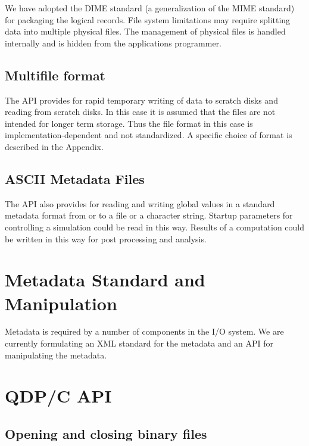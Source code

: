 \documentclass{article}
\begin{document}
We have adopted the DIME standard (a generalization of the MIME
standard) for packaging the logical records.  File system limitations
may require splitting data into multiple physical files.  The
management of physical files is handled internally and is hidden from
the applications programmer.

\subsection{Multifile format}

The API provides for rapid temporary writing of data to scratch disks
and reading from scratch disks.  In this case it is assumed that the
files are not intended for longer term storage.  Thus the file format
in this case is implementation-dependent and not standardized.  A
specific choice of format is described in the Appendix.

\subsection{ASCII Metadata Files}

The API also provides for reading and writing global values in a
standard metadata format from or to a file or a character string.
Startup parameters for controlling a simulation could be read in this
way.  Results of a computation could be written in this way for post
processing and analysis.

\section{Metadata Standard and Manipulation}

Metadata is required by a number of components in the I/O system.  We
are currently formulating an XML standard for the metadata and an API
for manipulating the metadata.

\section{QDP/C API}

\subsection{Opening and closing binary files}
\end{document}
